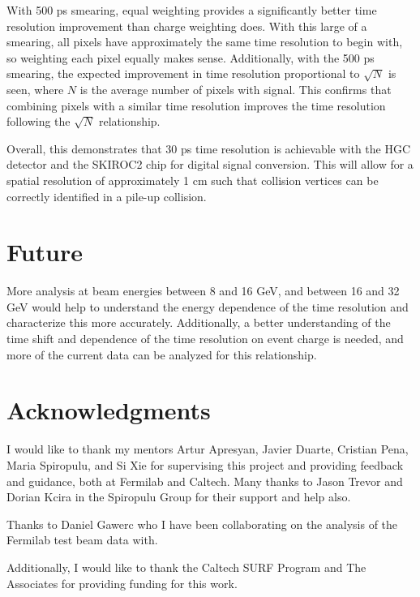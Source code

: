 \documentclass[twocolumn,aps,prd,reprint]{revtex4-1}
\begin{document}
With 500 ps smearing, equal weighting provides a significantly better time resolution improvement than charge weighting does. With this large of a smearing, all pixels have approximately the same time resolution to begin with, so weighting each pixel equally makes sense. Additionally, with the 500 ps smearing, the expected improvement in time resolution proportional to $\sqrt{N}$ is seen, where $N$ is the average number of pixels with signal. This confirms that combining pixels with a similar time resolution improves the time resolution following the $\sqrt{N}$ relationship.

Overall, this demonstrates that 30 ps time resolution is achievable with the HGC detector and the SKIROC2 chip for digital signal conversion. This will allow for a spatial resolution of approximately 1 cm such that collision vertices can be correctly identified in a pile-up collision.

\section{Future}

More analysis at beam energies between 8 and 16 GeV, and between 16 and 32 GeV would help to understand the energy dependence of the time resolution and characterize this more accurately. Additionally, a better understanding of the time shift and dependence of the time resolution on event charge is needed, and more of the current data can be analyzed for this relationship.

\section{Acknowledgments}

I would like to thank my mentors Artur Apresyan, Javier Duarte, Cristian Pena, Maria Spiropulu, and Si Xie for supervising this project and providing feedback and guidance, both at Fermilab and Caltech. Many thanks to Jason Trevor and Dorian Kcira in the Spiropulu Group for their support and help also. 

Thanks to Daniel Gawerc who I have been collaborating on the analysis of the Fermilab test beam data with.

Additionally, I would like to thank the Caltech SURF Program and The Associates for providing funding for this work.

\newpage

\nocite{*}

 
\end{document}
